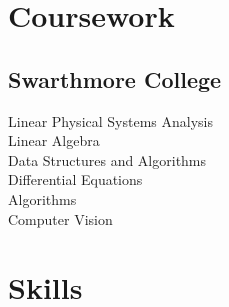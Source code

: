 \documentclass[]{deedy-resume}
\begin{document}
\begin{minipage}[t]{0.33\textwidth}
\section{Coursework}
\subsection{Swarthmore College}
Linear Physical Systems Analysis \\
Linear Algebra \\
Data Structures and Algorithms \\
Differential Equations \\
Algorithms \\ 
Computer Vision

\sectionspace



\section{Skills}

\end{minipage}
\end{document}
